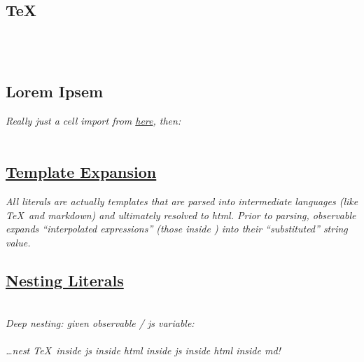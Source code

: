 \subsection*{\TeX}
\\
\\


\subsection*{Lorem Ipsem}
\textit{Really just a cell import from \href{https://observablehq.com/@jashkenas/lorem-ipsum}{here}, then:}\\
\\


\subsection*{\href{https://tinyurl.com/u6y8b4pd}{Template Expansion}}
\textit{All literals are actually templates that are parsed into intermediate languages (like \TeX\ and markdown) and ultimately resolved to html. Prior to parsing, observable expands ``interpolated expressions'' (those inside \cde{\$\{\dots\}}) into their ``substituted'' string value.}\\


\subsection*{\href{}{Nesting Literals}}
\\

\textit{Deep nesting: given observable / js variable:}\\
\\
\textit{\dots nest \TeX\ inside js inside html inside js inside html inside md!}\\
\\
\\
\\
\\